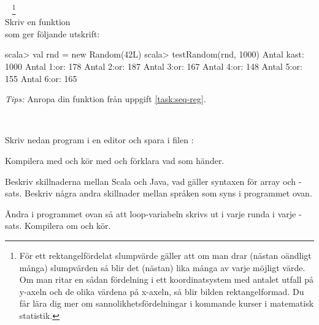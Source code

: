 {\Task  \what~ \footnote{För ett rektangelfördelat slumpvärde gäller att om man drar (nästan oändligt många) slumpvärden så blir det (nästan) lika många av varje möjligt värde. Om man ritar en sådan fördelning i ett koordinatsystem med antalet utfall på y-axeln och de olika värdena på x-axeln, så blir bilden rektangelformad. Du får lära dig mer om sannolikhetsfördelningar i kommande kurser i matematisk statistik.} \\Skriv en funktion  \\ som ger följande utskrift:
\begin{REPL}
scala> val rnd = new Random(42L)
scala> testRandom(rnd, 1000)
Antal kast: 1000
Antal 1:or: 178
Antal 2:or: 187
Antal 3:or: 167
Antal 4:or: 148
Antal 5:or: 155
Antal 6:or: 165
\end{REPL}

\emph{Tips:}
Anropa din funktion  från uppgift \ref{task:seq-reg}.


\SOLUTION


\TaskSolved \what





\QUESTEND









\QUESTBEGIN

\Task  \what~

\Subtask Skriv nedan program i en editor och spara i filen :


\Subtask Kompilera med  och kör med  och förklara vad som händer.

\Subtask\Pen Beskriv skillnaderna mellan Scala och Java, vad gäller syntaxen för array och -sats. Beskriv några andra skillnader mellan språken som syns i programmet ovan.

\Subtask Ändra i programmet ovan så att loop-variabeln  skrivs ut i varje runda i varje -sats. Kompilera om och kör.

}
